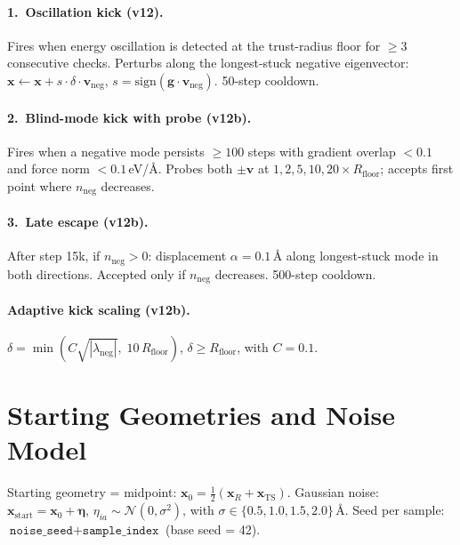 \documentclass[11pt,a4paper]{article}
\newcommand{\vect}[1]{\bm{#1}}
\theoremstyle{definition}
\begin{document}
\paragraph{1.\ Oscillation kick (v12).}
Fires when energy oscillation is detected at the trust-radius floor for
$\geq 3$ consecutive checks.  Perturbs along the longest-stuck negative
eigenvector:
$\vect{x} \leftarrow \vect{x} + s \cdot \delta \cdot \vect{v}_\text{neg}$,
$s = \text{sign}(\vect{g} \cdot \vect{v}_\text{neg})$.
50-step cooldown.

\paragraph{2.\ Blind-mode kick with probe (v12b).}
Fires when a negative mode persists $\geq 100$ steps with gradient overlap
$< 0.1$ and force norm $< 0.1$\,eV/\AA.  Probes both $\pm\vect{v}$ at
$1, 2, 5, 10, 20 \times R_\text{floor}$; accepts first point where
$n_\text{neg}$ decreases.

\paragraph{3.\ Late escape (v12b).}
After step 15k, if $n_\text{neg} > 0$: displacement $\alpha = 0.1$\,\AA{}
along longest-stuck mode in both directions.  Accepted only if
$n_\text{neg}$ decreases.  500-step cooldown.

\paragraph{Adaptive kick scaling (v12b).}
$\delta = \min(C\sqrt{|\lambda_\text{neg}|},\; 10\,R_\text{floor})$,
$\delta \geq R_\text{floor}$, with $C = 0.1$.

\section{Starting Geometries and Noise Model}
\label{app:noise}

Starting geometry = midpoint:
$\vect{x}_0 = \tfrac{1}{2}(\vect{x}_R + \vect{x}_\text{TS})$.
Gaussian noise: $\vect{x}_\text{start} = \vect{x}_0 + \bm{\eta}$,
$\eta_{ia} \sim \mathcal{N}(0, \sigma^2)$, with
$\sigma \in \{0.5, 1.0, 1.5, 2.0\}$\,\AA.
Seed per sample: $\texttt{noise\_seed} + \texttt{sample\_index}$
(base seed = 42).
\end{document}
